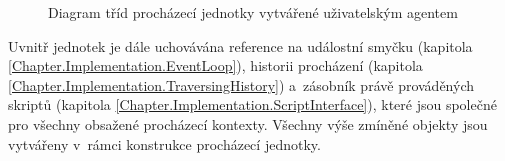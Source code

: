 \begin{figure}[H]
  \begin{center}
    \caption{Diagram tříd procházecí jednotky vytvářené uživatelským agentem}
    \label{Figure.UserAgentAndBrowsingUnit}
  \end{center}
\end{figure}

Uvnitř jednotek je dále uchovávána reference na událostní smyčku (kapitola \ref{Chapter.Implementation.EventLoop}), historii procházení (kapitola \ref{Chapter.Implementation.TraversingHistory}) a~zásobník právě prováděných skriptů (kapitola \ref{Chapter.Implementation.ScriptInterface}), které jsou společné pro všechny obsažené procházecí kontexty. Všechny výše zmíněné objekty jsou vytvářeny v~rámci konstrukce procházecí jednotky.

